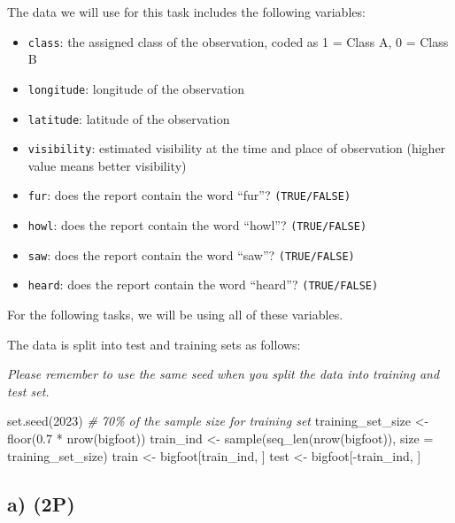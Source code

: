 \documentclass[
]{article}
\newenvironment{Shaded}{\begin{snugshade}}{\end{snugshade}}
\newcommand{\AttributeTok}[1]{\textcolor[rgb]{0.77,0.63,0.00}{#1}}
\newcommand{\CommentTok}[1]{\textcolor[rgb]{0.56,0.35,0.01}{\textit{#1}}}
\newcommand{\DecValTok}[1]{\textcolor[rgb]{0.00,0.00,0.81}{#1}}
\newcommand{\FloatTok}[1]{\textcolor[rgb]{0.00,0.00,0.81}{#1}}
\newcommand{\FunctionTok}[1]{\textcolor[rgb]{0.00,0.00,0.00}{#1}}
\newcommand{\NormalTok}[1]{#1}
\newcommand{\OtherTok}[1]{\textcolor[rgb]{0.56,0.35,0.01}{#1}}
\newcommand{\SpecialCharTok}[1]{\textcolor[rgb]{0.00,0.00,0.00}{#1}}
\providecommand{\tightlist}{%
  \setlength{\itemsep}{0pt}\setlength{\parskip}{0pt}}
\begin{document}
The data we will use for this task includes the following variables:

\begin{itemize}
\tightlist
\item
  \texttt{class}: the assigned class of the observation, coded as 1 =
  Class A, 0 = Class B
\item
  \texttt{longitude}: longitude of the observation
\item
  \texttt{latitude}: latitude of the observation
\item
  \texttt{visibility}: estimated visibility at the time and place of
  observation (higher value means better visibility)
\item
  \texttt{fur}: does the report contain the word ``fur''?
  \texttt{(TRUE/FALSE)}
\item
  \texttt{howl}: does the report contain the word ``howl''?
  \texttt{(TRUE/FALSE)}
\item
  \texttt{saw}: does the report contain the word ``saw''?
  \texttt{(TRUE/FALSE)}
\item
  \texttt{heard}: does the report contain the word ``heard''?
  \texttt{(TRUE/FALSE)}
\end{itemize}

For the following tasks, we will be using all of these variables.

The data is split into test and training sets as follows:

\emph{Please remember to use the same seed when you split the data into
training and test set.}

\begin{Shaded}
\begin{Highlighting}[]
\FunctionTok{set.seed}\NormalTok{(}\DecValTok{2023}\NormalTok{)}
\CommentTok{\# 70\% of the sample size for training set}
\NormalTok{training\_set\_size }\OtherTok{\textless{}{-}} \FunctionTok{floor}\NormalTok{(}\FloatTok{0.7} \SpecialCharTok{*} \FunctionTok{nrow}\NormalTok{(bigfoot))}
\NormalTok{train\_ind }\OtherTok{\textless{}{-}} \FunctionTok{sample}\NormalTok{(}\FunctionTok{seq\_len}\NormalTok{(}\FunctionTok{nrow}\NormalTok{(bigfoot)), }\AttributeTok{size =}\NormalTok{ training\_set\_size)}
\NormalTok{train }\OtherTok{\textless{}{-}}\NormalTok{ bigfoot[train\_ind, ]}
\NormalTok{test }\OtherTok{\textless{}{-}}\NormalTok{ bigfoot[}\SpecialCharTok{{-}}\NormalTok{train\_ind, ]}
\end{Highlighting}
\end{Shaded}

\hypertarget{a-2p}{%
\subsection{a) (2P)}\label{a-2p}}
\end{document}
